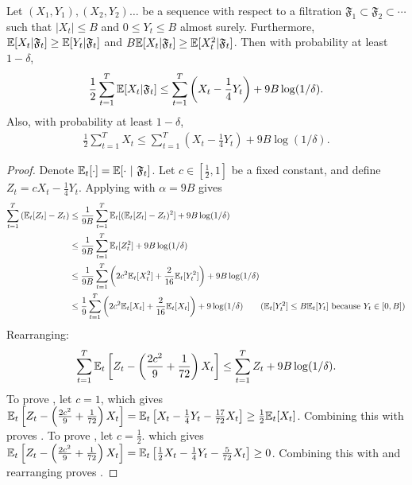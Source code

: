 \begin{lemma}\label{lem: useful inequali}
    Let $(X_1, Y_1), (X_2, Y_2)\ldots$ be a sequence with respect to a filtration $\mathfrak{F}_1 \subset \mathfrak{F}_2 \subset \cdots$ such that $|X_t|\leq B$ and $0\leq Y_t\leq B$ almost surely. Furthermore, $\mathbb{E}[X_t|\mathfrak{F}_t]\geq \mathbb{E}[Y_t|\mathfrak{F}_t] $ and $B\mathbb{E}[X_t|\mathfrak{F}_t]\geq \mathbb{E}[X_t^2|\mathfrak{F}_t]$. Then with probability at least $1-\delta$, 
    \begin{align}
        \frac{1}{2}\sum_{t=1}^T \mathbb{E}[X_t|\mathfrak{F}_t] \leq \sum_{t=1}^T \left(X_t - \frac{1}{4}Y_t\right) + 9B\log(1/\delta).\label{eq: useful 11}  
    \end{align}
    Also, with probability at least $1-\delta$, 
    \begin{align}
        \frac{1}{2}\sum_{t=1}^T X_t \leq \sum_{t=1}^T \left(X_t - \frac{1}{4}Y_t\right) + 9B\log(1/\delta).\label{eq: useful 22}   
    \end{align}
    
\end{lemma}
\begin{proof}
    Denote $\mathbb{E}_t[\cdot]=\mathbb{E}[\cdot~|~\mathfrak{F}_t]$. Let $c\in[\frac{1}{2},1]$ be a fixed constant, and define $Z_t = cX_t - \frac{1}{4}Y_t$. Applying  with $\alpha=9B$ gives 
    \begin{align*}
        \sum_{t=1}^T  \left(\E_t[Z_t] - Z_t\right) 
        &\leq \frac{1}{9B}\sum_{t=1}^T  \E_t[(\E_t[Z_t] - Z_t)^2] + 9B\log(1/\delta) \\
        &\leq \frac{1}{9B}\sum_{t=1}^T  \E_t[Z_t^2] + 9B\log(1/\delta) \\
        &\leq \frac{1}{9B} \sum_{t=1}^T \left(2c^2\E_t[X_t^2] + \frac{2}{16}\E_t[Y_t^2] \right) + 9B\log(1/\delta) \\
        &\leq \frac{1}{9} \sum_{t=1}^T \left(2c^2\E_t[X_t] + \frac{2}{16}\E_t[X_t] \right) + 9\log(1/\delta) \tag{$\E_t[Y_t^2]\leq B\E_t[Y_t]$ because $Y_t\in[0,B]$}
    \end{align*}
    Rearranging:  
    \begin{align}
       \sum_{t=1}^T \mathbb{E}_t\left[Z_t - \left(\frac{2c^2}{9} + \frac{1}{72}\right)X_t\right]\leq \sum_{t=1}^T Z_t + 9B\log(1/\delta). \label{eq: useful44}
    \end{align}
    To prove , let $c=1$, which gives 
    $\mathbb{E}_t\left[Z_t - \left(\frac{2c^2}{9} + \frac{1}{72}\right)X_t\right]= \mathbb{E}_t\left[X_t - \frac{1}{4}Y_t - \frac{17}{72} X_t\right] \geq \frac{1}{2}\mathbb{E}_t[X_t]  $. Combining this with  proves . To prove , let $c=\frac{1}{2}$. which gives  $\mathbb{E}_t\left[Z_t - \left(\frac{2c^2}{9} + \frac{1}{72}\right)X_t\right]= \mathbb{E}_t\left[\frac{1}{2}X_t - \frac{1}{4}Y_t - \frac{5}{72} X_t\right] \geq 0$. Combining this with  and rearranging proves . 
\end{proof}

